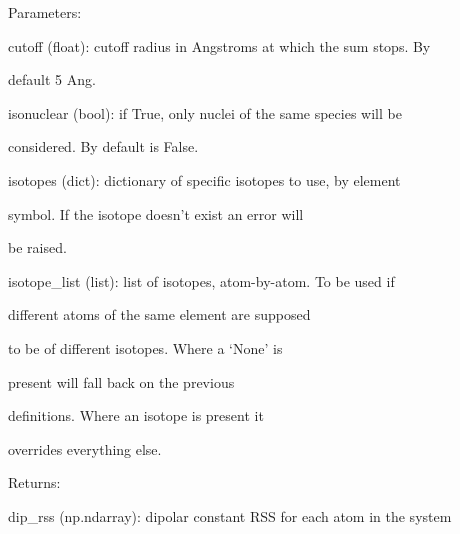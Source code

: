 \documentclass[letterpaper,10pt,english]{sphinxmanual}
\begin{document}
\begin{fulllineitems}
\begin{DUlineblock}{0em}
\item[] Parameters:
\item[]
\begin{DUlineblock}{\DUlineblockindent}
\item[] cutoff (float): cutoff radius in Angstroms at which the sum stops. By
\item[]
\begin{DUlineblock}{\DUlineblockindent}
\item[] default 5 Ang.
\end{DUlineblock}
\item[] isonuclear (bool): if True, only nuclei of the same species will be
\item[]
\begin{DUlineblock}{\DUlineblockindent}
\item[] considered. By default is False.
\end{DUlineblock}
\item[] isotopes (dict): dictionary of specific isotopes to use, by element
\item[]
\begin{DUlineblock}{\DUlineblockindent}
\item[] symbol. If the isotope doesn't exist an error will
\item[] be raised.
\end{DUlineblock}
\item[] isotope\_list (list): list of isotopes, atom-by-atom. To be used if
\item[]
\begin{DUlineblock}{\DUlineblockindent}
\item[] different atoms of the same element are supposed
\item[] to be of different isotopes. Where a `None' is
\item[] present will fall back on the previous
\item[] definitions. Where an isotope is present it
\item[] overrides everything else.
\end{DUlineblock}
\end{DUlineblock}
\end{DUlineblock}

\begin{DUlineblock}{0em}
\item[] Returns:
\item[]
\begin{DUlineblock}{\DUlineblockindent}
\item[] dip\_rss (np.ndarray): dipolar constant RSS for each atom in the system
\end{DUlineblock}
\end{DUlineblock}


\end{fulllineitems}
\end{document}
